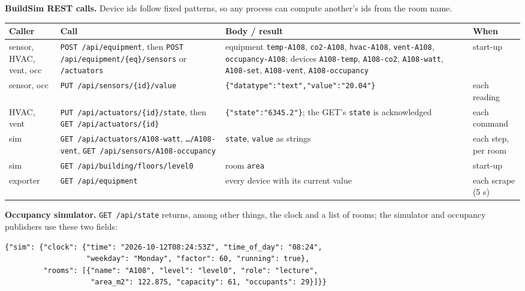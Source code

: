 \documentclass[11pt]{article}
\makeatletter
\DeclareRobustCommand{\_}{\ifmmode\nfss@text{\textunderscore}\else\textunderscore\allowbreak\fi}
\makeatother
\begin{document}
\textbf{BuildSim REST calls.} Device ids follow fixed patterns, so any process can
compute another's ids from the room name.

\begin{longtable}[]{@{}
  >{\raggedright\arraybackslash}p{}
  >{\raggedright\arraybackslash}p{}
  >{\raggedright\arraybackslash}p{}
  >{\raggedright\arraybackslash}p{}@{}}
\toprule
\textbf{Caller} & \textbf{Call} & \textbf{Body / result} & \textbf{When} \\
\midrule
\endhead
sensor, HVAC, vent, occ & \texttt{POST /api/equipment}, then \texttt{POST /api/equipment/\{eq\}/sensors} or \texttt{/actuators} &
  equipment \texttt{temp-A108}, \texttt{co2-A108}, \texttt{hvac-A108}, \texttt{vent-A108}, \texttt{occupancy-A108}; devices \texttt{A108-temp}, \texttt{A108-co2}, \texttt{A108-watt}, \texttt{A108-set}, \texttt{A108-vent}, \texttt{A108-occupancy} & start-up \\
sensor, occ & \texttt{PUT /api/sensors/\{id\}/value} & \texttt{\{"data\_type":"text",\allowbreak"value":"20.04"\}} & each reading \\
HVAC, vent & \texttt{PUT /api/actuators/\{id\}/state}, then \texttt{GET /api/actuators/\{id\}} & \texttt{\{"state":"6345.2"\}}; the GET's \texttt{state} is acknowledged & each command \\
sim & \texttt{GET /api/actuators/A108-watt}, \texttt{…/A108-vent}, \texttt{GET /api/sensors/A108-occupancy} & \texttt{state}, \texttt{value} as strings & each step, per room \\
sim & \texttt{GET /api/building/floors/level0} & room \texttt{area} & start-up \\
exporter & \texttt{GET /api/equipment} & every device with its current value & each scrape (5 s) \\
\bottomrule
\end{longtable}

\textbf{Occupancy simulator.} \texttt{GET /api/state} returns, among other
things, the clock and a list of rooms; the simulator and occupancy publishers use
these two fields:

\begin{lstlisting}
{"sim": {"clock": {"time": "2026-10-12T08:24:53Z", "time_of_day": "08:24",
                   "weekday": "Monday", "factor": 60, "running": true},
         "rooms": [{"name": "A108", "level": "level0", "role": "lecture",
                    "area_m2": 122.875, "capacity": 61, "occupants": 29}]}}
\end{lstlisting}
\end{document}
